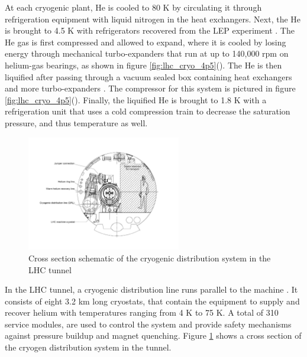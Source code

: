 \par At each cryogenic plant, He is cooled to 80 K by circulating it
through refrigeration equipment with liquid nitrogen in the heat
exchangers\cite{LHC:LHC_lhc_cryogen_cernWebsite}.  Next, the He is
brought to 4.5 K with refrigerators recovered from the LEP experiment
\cite{LHC:LHC_cool_challenge}.  The He gas is first compressed and allowed
to expand, where it is cooled by losing energy through mechanical
turbo-expanders that run at up to 140,000 rpm on helium-gas
bearings, as shown in figure
\ref{fig:lhc_cryo_4p5}().  The He
is then liquified after passing through a vacuum sealed box containing
heat exchangers and more turbo-expanders
\cite{LHC:LHC_cryogenicHe_system_Lebrun}. The compressor for this
system is pictured in figure
\ref{fig:lhc_cryo_4p5}().  Finally,
the liquified He is brought to 1.8 K with a refrigeration unit that
uses a cold compression train to decrease the saturation pressure, and
thus temperature as well. 

\begin{figure}[h]
   \centering
  \includegraphics[width=0.6\textwidth]{Figures/LHC_Diagrams/LHC_CryogenInTunnel.pdf}
  \caption{Cross section schematic of the cryogenic distribution
    system in the LHC tunnel \cite{lhc:machine_description}} \label{fig:lhc_cryogen_tunnel_xs}
\end{figure}

\par In the LHC tunnel, a cryogenic distribution line runs parallel to
the machine \cite{LHC:LHC_cool_challenge}.  It consists of eight 3.2
km long cryostats, that contain the equipment to supply and recover
helium with temperatures ranging from 4 K to 75 K.  A total of 310
service modules, are used to control the system and provide safety
mechanisms against pressure buildup and magnet quenching.  Figure
\ref{fig:lhc_cryogen_tunnel_xs} shows a cross section of the cryogen
distribution system in the tunnel. 

